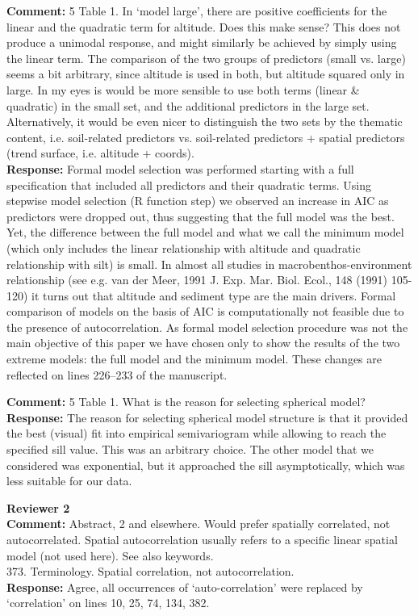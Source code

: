\documentclass{letter}
\begin{document}
\begin{letter}
\textbf{Comment:} 
 5 Table 1. In `model large', there are positive coefficients for the linear and the quadratic term for altitude. Does this make sense? This does not produce a unimodal response, and might similarly be achieved by simply using the linear term. The comparison of the two groups of predictors (small vs. large) seems a bit arbitrary, since altitude is used in both, but altitude squared only in large. In my eyes is would be more sensible to use both terms (linear \& quadratic) in the small set, and the additional predictors in the large set. Alternatively, it would be even nicer to distinguish the two sets by the thematic content, i.e. soil-related predictors vs. soil-related predictors + spatial predictors (trend surface, i.e. altitude + coords).  \\  
\textbf{Response:} Formal model selection was performed starting with a full specification that included all predictors and their quadratic terms. Using stepwise model selection (R function step) we observed an increase in AIC as predictors were dropped out, thus suggesting that the full model was the best. Yet, the difference between the full model and what we call the minimum model (which only includes the linear relationship with altitude and quadratic relationship with silt) is small. In almost all studies in macrobenthos-environment relationship (see e.g. van der Meer, 1991 J. Exp. Mar. Biol. Ecol., 148 (1991) 105-120) it turns out that altitude and sediment type are the main drivers. Formal comparison of models on the basis of AIC is computationally not feasible due to the presence of autocorrelation. As formal model selection procedure was not the main objective of this paper we have chosen only to show the results of the two extreme models: the full model and the minimum model. These changes are reflected on lines 226--233 of the manuscript.

\textbf{Comment:}  5 Table 1. What is the reason for selecting spherical model?\\
\textbf{Response:} The reason for selecting spherical model structure is that it provided the best (visual) fit into empirical semivariogram while allowing to reach the specified sill value. This was an arbitrary choice. The other model that we considered was exponential, but it approached the sill asymptotically, which was less suitable for our data.

\textbf{Reviewer 2}\\

\textbf{Comment:} 
Abstract, 2 and elsewhere. Would prefer spatially correlated, not autocorrelated. Spatial autocorrelation usually refers to a specific linear spatial model (not used here). See also keywords.\\ 373. Terminology. Spatial correlation, not autocorrelation.\\
\textbf{Response:} Agree, all occurrences of `auto-correlation' were replaced by `correlation' on lines 10, 25, 74, 134, 382. 


\end{letter}
\end{document}
